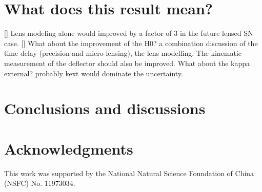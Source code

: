 \documentclass[useAMS,usenatbib,usegraphicx]{mn2e}
\begin{document}
\section{What does this result mean?}
[] Lens modeling alone would improved by a factor of 3 in the future lensed SN case.
[] What about the improvement of the H0? a combination discussion of the time delay (precision and micro-lensing), the lens modelling. The kinematic measurement of the deflector should also be improved. What about the kappa external? probably kext would dominate the uncertainty. 

\section{Conclusions and discussions}



\section*{Acknowledgments}
This work was supported by the National Natural Science Foundation of China (NSFC) No. 11973034.
\end{document}
